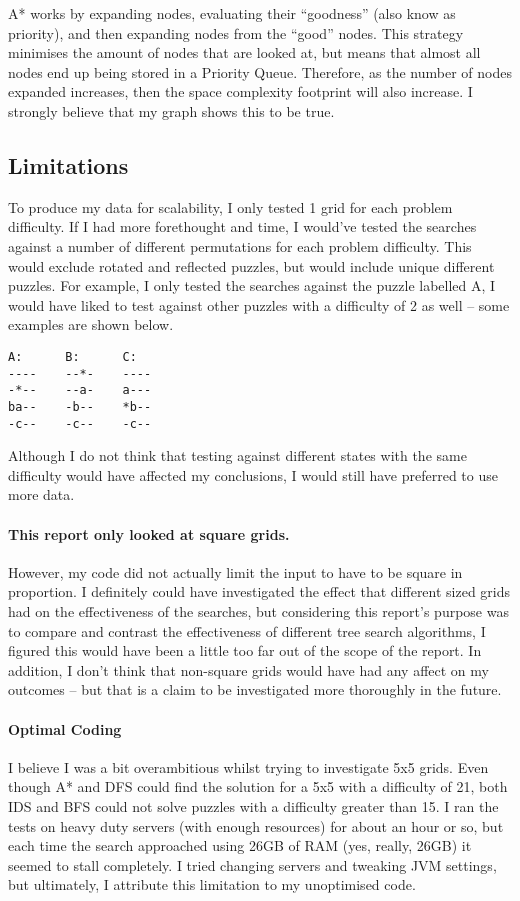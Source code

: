 \documentclass[a4paper]{article}
\begin{document}
A* works by expanding nodes, evaluating their ``goodness'' (also know as priority), and then expanding nodes from the ``good'' nodes.
This strategy minimises the amount of nodes that are looked at, but means that almost all nodes end up being stored in a Priority Queue.
Therefore, as the number of nodes expanded increases, then the space complexity footprint will also increase.
I strongly believe that my graph shows this to be true.

\subsection{Limitations}
To produce my data for scalability, I only tested 1 grid for each problem difficulty.
If I had more forethought and time, I would've tested the searches against a number of different permutations for each problem difficulty.
This would exclude rotated and reflected puzzles, but would include unique different puzzles.
For example, I only tested the searches against the puzzle labelled A, I would have liked to test against other puzzles with a difficulty of 2 as well -- some examples are shown below.
\begin{verbatim}
A:      B:      C:
----    --*-    ----
-*--    --a-    a---
ba--    -b--    *b--
-c--    -c--    -c--
\end{verbatim}

Although I do not think that testing against different states with the same difficulty would have affected my conclusions, I would still have preferred to use more data.

\paragraph{This report only looked at square grids.}
However, my code did not actually limit the input to have to be square in proportion.
I definitely could have investigated the effect that different sized grids had on the effectiveness of the searches,
  but considering this report's purpose was to compare and contrast the effectiveness of different tree search algorithms, I figured this would have been a little too far out of the scope of the report.
In addition, I don't think that non-square grids would have had any affect on my outcomes -- but that is a claim to be investigated more thoroughly in the future.

\paragraph{Optimal Coding}
I believe I was a bit overambitious whilst trying to investigate 5x5 grids.
Even though A* and DFS could find the solution for a 5x5 with a difficulty of 21, both IDS and BFS could not solve puzzles with a difficulty greater than 15.
I ran the tests on heavy duty servers (with enough resources) for about an hour or so, but each time the search approached using 26GB of RAM (yes, really, 26GB) it seemed to stall completely.
I tried changing servers and tweaking JVM settings, but ultimately, I attribute this limitation to my unoptimised code.
\end{document}
